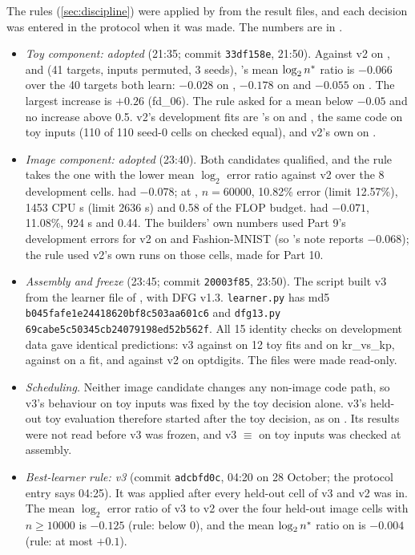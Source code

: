 The rules (\cref{sec:discipline}) were applied by  from the result files, and each decision was entered in the protocol when it was made. The numbers are in .
\begin{itemize}
\item \emph{Toy component: adopted} (21:35; commit \texttt{33df158e}, 21:50). Against v2 on ,  and  (41 targets, inputs permuted, 3 seeds), 's mean $\log_2n^{*}$ ratio is $-0.066$ over the 40 targets both learn: $-0.028$ on , $-0.178$ on  and $-0.055$ on . The largest increase is $+0.26$ (fd\_06). The rule asked for a mean below $-0.05$ and no increase above 0.5. v2's development fits are 's on  and , the same code on toy inputs (110 of 110 seed-0 cells on  checked equal), and v2's own on .
\item \emph{Image component:  adopted} (23:40). Both candidates qualified, and the rule takes the one with the lower mean $\log_2$ error ratio against v2 over the 8 development cells.  had $-0.078$; at , $n=60000$, 10.82\% error (limit 12.57\%), 1453 CPU s (limit 2636 s) and 0.58 of the FLOP budget.  had $-0.071$, 11.08\%, 924 s and 0.44. The builders' own numbers used Part 9's  development errors for v2 on  and Fashion-MNIST (so 's note reports $-0.068$); the rule used v2's own runs on those cells, made for Part 10.
\item \emph{Assembly and freeze} (23:45; commit \texttt{20003f85}, 23:50). The script  built v3 from the learner file of , with DFG v1.3. \texttt{learner.py} has md5 \texttt{b045fafe1e24418620bf8c503aa601c6} and \texttt{dfg13.py} \texttt{69cabe5c50345cb24079198ed52b562f}. All 15 identity checks on development data gave identical predictions: v3 against  on 12 toy fits and on kr\_vs\_kp, against  on a  fit, and against v2 on optdigits. The files were made read-only.
\item \emph{Scheduling.} Neither image candidate changes any non-image code path, so v3's behaviour on toy inputs was fixed by the toy decision alone. v3's held-out toy evaluation therefore started after the toy decision, as  on . Its results were not read before v3 was frozen, and v3 $\equiv$  on toy inputs was checked at assembly.
\item \emph{Best-learner rule: v3} (commit \texttt{adcbfd0c}, 04:20 on 28 October; the protocol entry says 04:25). It was applied after every held-out cell of v3 and v2 was in. The mean $\log_2$ error ratio of v3 to v2 over the four held-out image cells with $n\ge10000$ is $-0.125$ (rule: below 0), and the mean $\log_2n^{*}$ ratio on  is $-0.004$ (rule: at most $+0.1$).
\end{itemize}

